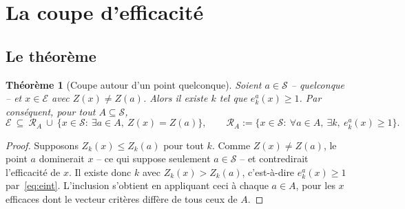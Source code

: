 \documentclass[11pt,a4paper]{article}
\theoremstyle{plain}
\newtheorem{theorem}{Théorème}
\theoremstyle{remark}
\newcommand{\Zk}{Z_k}
\newcommand{\Ecal}{\mathcal{E}}
\newcommand{\Scal}{\mathcal{S}}
\newcommand{\Rcal}{\mathcal{R}}
\begin{document}
\section{La coupe d'efficacité}
\label{sec:effcut}

\subsection{Le théorème}

\begin{theorem}[Coupe autour d'un point quelconque]\label{th:effcut}
Soient $a\in\Scal$ -- \emph{quelconque} -- et $x\in\Ecal$ avec
$Z(x)\ne Z(a)$. Alors il existe $k$ tel que $e^a_k(x)\ge 1$. Par
conséquent, pour tout $A\subseteq\Scal$,
\[
  \Ecal\ \subseteq\ \Rcal_A\ \cup\
  \bigl\{x\in\Scal:\ \exists a\in A,\ Z(x)=Z(a)\bigr\},
  \qquad
  \Rcal_A:=\bigl\{x\in\Scal:\ \forall a\in A,\ \exists k,\ e^a_k(x)\ge 1\bigr\}.
\]
\end{theorem}

\begin{proof}
Supposons $\Zk(x)\le \Zk(a)$ pour tout $k$. Comme $Z(x)\ne Z(a)$, le point
$a$ dominerait $x$ -- ce qui suppose seulement $a\in\Scal$ -- et
contredirait l'efficacité de $x$. Il existe donc $k$ avec
$\Zk(x)>\Zk(a)$, c'est-à-dire $e^a_k(x)\ge 1$ par~\eqref{eq:eint}.
L'inclusion s'obtient en appliquant ceci à chaque $a\in A$, pour les $x$
efficaces dont le vecteur critères diffère de tous ceux de $A$.
\end{proof}
\end{document}
